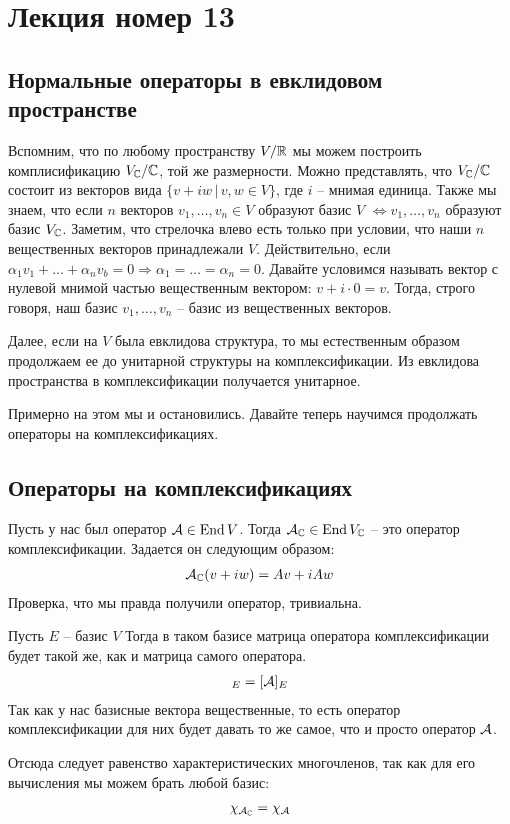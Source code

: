 \section{Лекция номер 13}

\subsection{Нормальные операторы в евклидовом пространстве}

Вспомним, что по любому пространству $V / \mathbb{R}$ мы можем построить комплисификацию $V_{\mathbb{C}} / \mathbb{C}$, той же размерности.
Можно представлять, что $V_{\mathbb{C}} / \mathbb{C}$ состоит из векторов вида $\{ v + iw \, | \, v,w \in V \}$, где $i$ -- мнимая единица. 
Также мы знаем, что если $n$ векторов $v_1, \dots, v_n \in V$ образуют базис $V$ $\Longleftrightarrow v_1, \dots, v_n$ образуют базис $V_{\mathbb{C}}$. 
Заметим, что стрелочка влево есть только при условии, что наши $n$ вещественных векторов принадлежали $V$. 
Действительно, если $\alpha_1 v_1 + \dots + \alpha_n v_b = 0 \Longrightarrow \alpha_1 = \dots = \alpha_n = 0$.
Давайте условимся называть вектор с нулевой мнимой частью вещественным вектором: $v + i \cdot 0 = v$. Тогда, строго говоря, 
наш базис $v_1, \dots, v_n$ -- базис из вещественных векторов. 

Далее, если на $V$ была евклидова структура, то мы естественным образом продолжаем ее до унитарной структуры на комплексификации. 
Из евклидова пространства в комплексификации получается унитарное. 

Примерно на этом мы и остановились. Давайте теперь научимся продолжать операторы на комплексификациях.

\subsection*{Операторы на комплексификациях}

\begin{conj}
Пусть у нас был оператор $\mathcal{A} \in \operatorname{End}{V}$.
Тогда $\mathcal{A}_{\mathbb{C}} \in \operatorname{End}{V_{\mathbb{C}}}$ -- это оператор комплексификации. Задается он следующим образом:
\begin{gather*}
    \mathcal{A}_{\mathbb{C}}(v + iw) = Av + iAw
\end{gather*}
Проверка, что мы правда получили оператор, тривиальна. 
\end{conj}

\begin{conj}
Пусть $E$ -- базис $V$
Тогда в таком базисе матрица оператора комплексификации будет такой же, как и матрица самого оператора. 
\begin{gather*}
    [\A_{\C}]_{E} = [\A]_{E}
\end{gather*}
Так как у нас базисные вектора вещественные, то есть оператор комплексификации 
для них будет давать то же самое, что и просто оператор $\mathcal{A}$. 

Отсюда следует равенство характеристических многочленов, так как для его вычисления мы можем брать любой базис: 
\begin{gather*}
    \chi_{\mathcal{A}_{\mathbb{C}}} = \chi_{\mathcal{A}}
\end{gather*}
\end{conj}

